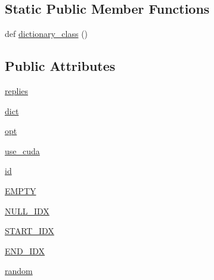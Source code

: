 \subsection*{Static Public Member Functions}
\begin{DoxyCompactItemize}
\item 
def \hyperlink{classparlai_1_1agents_1_1legacy__agents_1_1seq2seq_1_1torch__agent__v1_1_1TorchAgent_abc77ad96264e7597c46bc001a9a6af90}{dictionary\+\_\+class} ()
\end{DoxyCompactItemize}
\subsection*{Public Attributes}
\begin{DoxyCompactItemize}
\item 
\hyperlink{classparlai_1_1agents_1_1legacy__agents_1_1seq2seq_1_1torch__agent__v1_1_1TorchAgent_a91d101db75d3618e8240a44b258f3129}{replies}
\item 
\hyperlink{classparlai_1_1agents_1_1legacy__agents_1_1seq2seq_1_1torch__agent__v1_1_1TorchAgent_afa0def82ae9760fde7f60c0881b8a138}{dict}
\item 
\hyperlink{classparlai_1_1agents_1_1legacy__agents_1_1seq2seq_1_1torch__agent__v1_1_1TorchAgent_a4e938a91873bd6edde0ac7ed5299bc6a}{opt}
\item 
\hyperlink{classparlai_1_1agents_1_1legacy__agents_1_1seq2seq_1_1torch__agent__v1_1_1TorchAgent_aa8efd385be7532abd27359b5dbbbbb24}{use\+\_\+cuda}
\item 
\hyperlink{classparlai_1_1agents_1_1legacy__agents_1_1seq2seq_1_1torch__agent__v1_1_1TorchAgent_a60d1038c25746d97d791b82a5c8e0492}{id}
\item 
\hyperlink{classparlai_1_1agents_1_1legacy__agents_1_1seq2seq_1_1torch__agent__v1_1_1TorchAgent_aaed187f97f489122996e967206a01927}{E\+M\+P\+TY}
\item 
\hyperlink{classparlai_1_1agents_1_1legacy__agents_1_1seq2seq_1_1torch__agent__v1_1_1TorchAgent_a6e6a5f2f7644a6cc273bfa25eca17df6}{N\+U\+L\+L\+\_\+\+I\+DX}
\item 
\hyperlink{classparlai_1_1agents_1_1legacy__agents_1_1seq2seq_1_1torch__agent__v1_1_1TorchAgent_a37d6429a766547a68f72ffb6c27783db}{S\+T\+A\+R\+T\+\_\+\+I\+DX}
\item 
\hyperlink{classparlai_1_1agents_1_1legacy__agents_1_1seq2seq_1_1torch__agent__v1_1_1TorchAgent_aa78932aa1b5886cd03f1592bfa6ed4f5}{E\+N\+D\+\_\+\+I\+DX}
\item 
\hyperlink{classparlai_1_1agents_1_1legacy__agents_1_1seq2seq_1_1torch__agent__v1_1_1TorchAgent_a2f9045fdfe9f956ee5023de84dd25a06}{random}

\end{DoxyCompactItemize}
